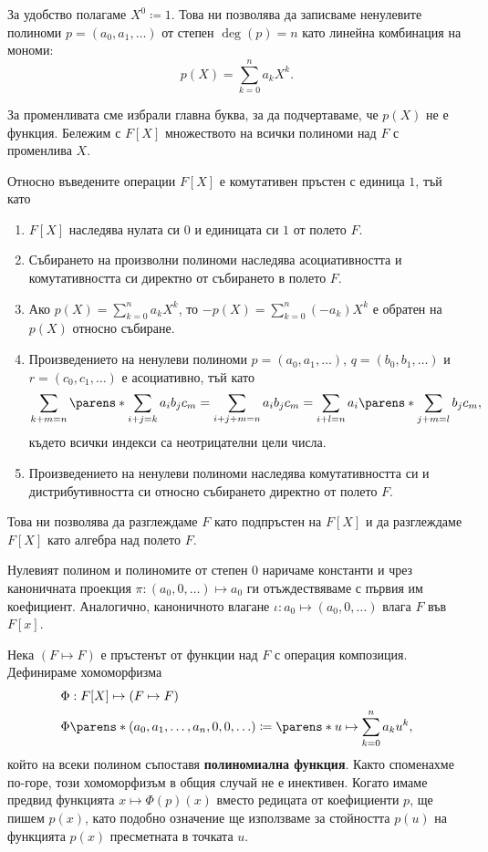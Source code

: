 \documentclass{../../common/topic}
\begin{document}
За удобство полагаме \( X^0 \coloneqq 1 \). Това ни позволява да записваме ненулевите полиноми \( p = (a_0, a_1, \ldots) \) от степен \( \deg(p) = n \) като линейна комбинация на мономи:
\begin{equation*}
  p(X) = \sum_{k=0}^n a_k X^k.
\end{equation*}

За променливата сме избрали главна буква, за да подчертаваме, че \( p(X) \) не е функция. Бележим с \( F[X] \) множеството на всички полиноми над \( F \) с променлива \( X \).

Относно въведените операции \( F[X] \) е комутативен пръстен с единица \( 1 \), тъй като
\begin{enumerate}
  \item \( F[X] \) наследява нулата си \( 0 \) и единицата си \( 1 \) от полето \( F \).
  \item Събирането на произволни полиноми наследява асоциативността и комутативността си директно от събирането в полето \( F \).
  \item Ако \( p(X) = \sum_{k=0}^n a_k X^k \), то \( -p(X) = \sum_{k=0}^n (-a_k) X^k \) е обратен на \( p(X) \) относно събиране.
  \item Произведението на ненулеви полиноми \( p = (a_0, a_1, \ldots) \), \( q = (b_0, b_1, \ldots) \) и \( r = (c_0, c_1, \ldots) \) е асоциативно, тъй като
  \begin{equation*}
    \sum_{k+m=n} \parens*{\sum_{i+j=k} a_i b_j } c_m
    =
    \sum_{i+j+m=n} a_i b_j c_m
    =
    \sum_{i+l=n} a_i \parens*{ \sum_{j+m=l} b_j c_m },
  \end{equation*}
  където всички индекси са неотрицателни цели числа.
  \item Произведението на ненулеви полиноми наследява комутативността си и дистрибутивността си относно събирането директно от полето \( F \).
\end{enumerate}

Това ни позволява да разглеждаме \( F \) като подпръстен на \( F[X] \) и да разглеждаме \( F[X] \) като алгебра над полето \( F \).

Нулевият полином и полиномите от степен \( 0 \) наричаме константи и чрез каноничната проекция \( \pi: (a_0, 0, \ldots) \mapsto a_0 \) ги отъждествяваме с първия им коефициент. Аналогично, каноничното влагане \( \iota: a_0 \mapsto (a_0, 0, \ldots) \) влага \( F \) във \( F[x] \).

Нека \( (F \mapsto F) \) е пръстенът от функции над \( F \) с операция композиция. Дефинираме хомоморфизма
\begin{align*}
  &\Phi: F[X] \mapsto (F \mapsto F) \\
  &\Phi\parens*{(a_0, a_1, \ldots, a_n, 0, 0, \ldots) } \coloneqq \parens*{ u \mapsto \sum_{k=0}^n a_k u^k },
\end{align*}
който на всеки полином съпоставя \textbf{полиномиална функция}. Както споменахме по-горе, този хомоморфизъм в общия случай не е инективен. Когато имаме предвид функцията \( x \mapsto \Phi(p)(x) \) вместо редицата от коефициенти \( p \), ще пишем \( p(x) \), като подобно означение ще използваме за стойността \( p(u) \) на функцията \( p(x) \) пресметната в точката \( u \).
\end{document}

